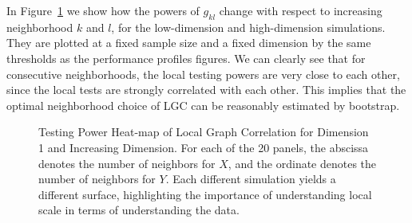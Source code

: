 \documentclass[11pt]{article}
\begin{document}
In Figure~\ref{figSim2} we show how the powers of $g_{kl}$ change with respect to increasing neighborhood $k$ and $l$, for the low-dimension and high-dimension simulations. They are plotted at a fixed sample size and a fixed dimension by the same thresholds as the performance profiles figures. We can clearly see that for consecutive neighborhoods, the local testing powers are very close to each other, since the local tests are strongly correlated with each other. This implies that the optimal neighborhood choice of LGC can be reasonably estimated by bootstrap.

\begin{figure}[htbp]
\hfil
{}
\caption{Testing Power Heat-map of Local Graph Correlation for Dimension 1 and Increasing Dimension.
For each of the 20 panels, the abscissa denotes the number of neighbors for $X$, and the ordinate denotes the number of neighbors for $Y$.  Each different simulation yields a different surface, highlighting the importance of understanding local scale in terms of understanding the data.}
\label{figSim2}
\end{figure}
\end{document}
